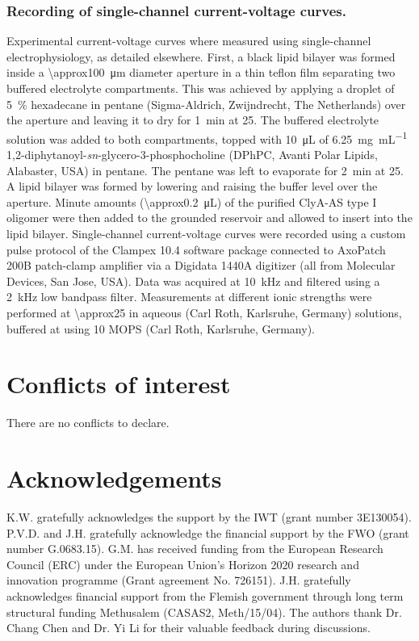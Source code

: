 \documentclass[twoside,twocolumn,9pt]{article}
\begin{document}
\subsubsection{Recording of single-channel current-voltage curves.}
%
Experimental current-voltage curves where measured using single-channel electrophysiology, as detailed
elsewhere.\cite{Maglia-2010,Soskine-2012,Soskine-2013} First, a black lipid bilayer was formed inside a
\SI{\approx100}{\um} diameter aperture in a thin teflon film separating two buffered electrolyte compartments.
This was achieved by applying a droplet of \SI{5}{\percent} hexadecane in pentane (Sigma-Aldrich, Zwijndrecht,
The Netherlands) over the aperture and leaving it to dry for \SI{1}{\minute} at \SI{25}{\dC}. The buffered
electrolyte solution was added to both compartments, topped with \SI{10}{\uL} of
\SI{6.25}{\milli\gram\per\milli\liter} 1,2-diphytanoyl-\textit{sn}-glycero-3-phosphocholine (DPhPC, Avanti
Polar Lipids, Alabaster, USA) in pentane. The pentane was left to evaporate for \SI{2}{\minute} at
\SI{25}{\dC}. A lipid bilayer was formed by lowering and raising the buffer level over the aperture. Minute
amounts (\SI{\approx0.2}{\uL}) of the purified ClyA-AS type I oligomer were then added to the grounded \cisi{}
reservoir and allowed to insert into the lipid bilayer. Single-channel current-voltage curves were recorded
using a custom pulse protocol of the Clampex 10.4 software package connected to AxoPatch 200B patch-clamp
amplifier via a Digidata 1440A digitizer (all from Molecular Devices, San Jose, USA). Data was acquired at
\SI{10}{\kHz} and filtered using a \SI{2}{\kHz} low bandpass filter. Measurements at different ionic strengths
were performed at \SI{\approx25}{\dC} in aqueous  (Carl Roth, Karlsruhe, Germany) solutions, buffered
at  using \SI{10}{\mM} MOPS (Carl Roth, Karlsruhe, Germany).

%
%
\section*{Conflicts of interest}
%
There are no conflicts to declare.

%
%
\section*{Acknowledgements}
%
K.W. gratefully acknowledges the support by the IWT (grant number 3E130054). P.V.D. and J.H. gratefully
acknowledge the financial support by the FWO (grant number G.0683.15). G.M. has received funding from the
European Research Council (ERC) under the European Union's Horizon 2020 research and innovation programme
(Grant agreement No. 726151). J.H. gratefully acknowledges financial support from the Flemish government
through long term structural funding Methusalem (CASAS2, Meth/15/04). The authors thank Dr. Chang Chen and Dr.
Yi Li for their valuable feedback during discussions.
\end{document}
